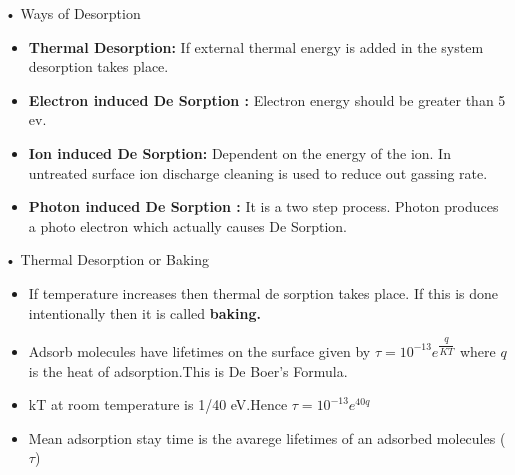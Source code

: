 \documentclass[11]{beamer}
\begin{document}
\begin{frame}{• Ways of Desorption }

\begin{itemize}
\item \textbf{Thermal Desorption:} If external thermal energy is added in the system desorption takes place.
\item \textbf{Electron induced De Sorption :}  Electron energy should be greater than  5 ev.
 \item \textbf{Ion induced De Sorption:} Dependent on the energy of the ion. In untreated surface ion discharge cleaning is used to reduce out gassing rate.
 \item \textbf{Photon induced De Sorption :} It is a two step process. Photon produces a photo  electron which actually causes De Sorption.



\end{itemize}

\end{frame}

\begin{frame}{• Thermal Desorption or Baking }

\begin{exampleblock}
   
   \begin{itemize}
   	\item   If temperature increases then thermal de sorption takes place. If this is done intentionally then it is called \textbf{baking.}   

	\item	Adsorb molecules have  lifetimes on the surface given by $\tau=10^{-13}e^{\dfrac{q}{KT}} $ where $q$ is the heat of adsorption.This is  De Boer's Formula.

	\item   kT at room temperature is 1/40 eV.Hence $\tau=10^{-13}e^{40q} $
	
	\item  Mean adsorption stay time  is the avarege lifetimes of an adsorbed molecules ($\tau $)
   \end{itemize}
     
  
  
  
\end{exampleblock}



\end{frame}
\end{document}
